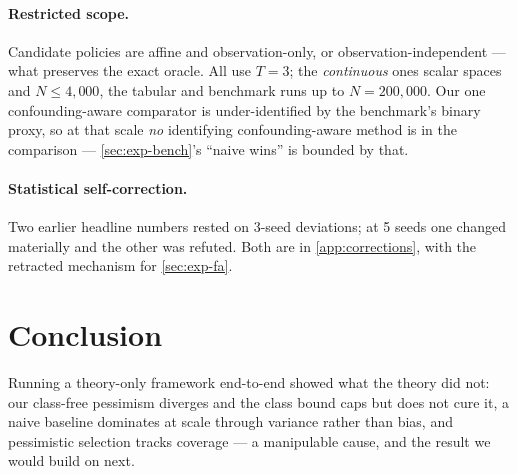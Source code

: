 \documentclass{article}
\theoremstyle{plain}
\theoremstyle{definition}
\begin{document}
\paragraph{Restricted scope.} Candidate policies are affine and
observation-only, or observation-independent --- what preserves the exact oracle.
All use $T{=}3$; the \emph{continuous} ones scalar spaces and $N\le4{,}000$, the
tabular and benchmark runs up to $N=200{,}000$. Our one confounding-aware
comparator is under-identified by the benchmark's binary proxy, so at that scale
\emph{no} identifying confounding-aware method is in the comparison ---
\cref{sec:exp-bench}'s ``naive wins'' is bounded by that.

\paragraph{Statistical self-correction.} Two earlier headline numbers rested on
3-seed deviations; at 5 seeds one changed materially and the other was refuted.
Both are in \cref{app:corrections}, with the retracted mechanism for
\cref{sec:exp-fa}.

\section{Conclusion}

Running a theory-only framework end-to-end showed what the theory did not: our
class-free pessimism diverges and the class bound caps but does not cure it, a
naive baseline dominates at scale through variance rather than bias, and
pessimistic selection tracks coverage --- a manipulable cause, and the result we
would build on next.




\newpage
\appendix
\onecolumn

\end{document}
